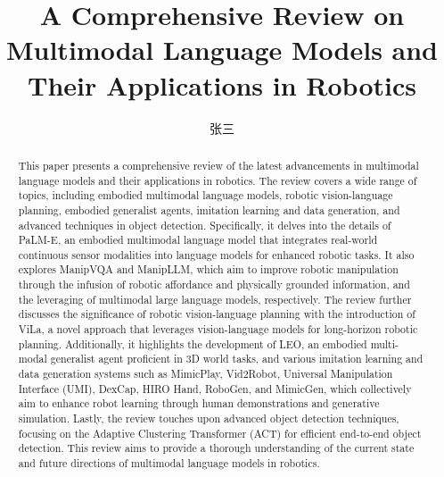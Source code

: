 \documentclass[a4paper]{article}
\title{A Comprehensive Review on Multimodal Language Models and Their Applications in Robotics}
\author{张三}
\begin{document}
\maketitle


 \begin{abstract} 
 This paper presents a comprehensive review of the latest advancements in multimodal language models and their applications in robotics. The review covers a wide range of topics, including embodied multimodal language models, robotic vision-language planning, embodied generalist agents, imitation learning and data generation, and advanced techniques in object detection. Specifically, it delves into the details of PaLM-E, an embodied multimodal language model that integrates real-world continuous sensor modalities into language models for enhanced robotic tasks. It also explores ManipVQA and ManipLLM, which aim to improve robotic manipulation through the infusion of robotic affordance and physically grounded information, and the leveraging of multimodal large language models, respectively. The review further discusses the significance of robotic vision-language planning with the introduction of ViLa, a novel approach that leverages vision-language models for long-horizon robotic planning. Additionally, it highlights the development of LEO, an embodied multi-modal generalist agent proficient in 3D world tasks, and various imitation learning and data generation systems such as MimicPlay, Vid2Robot, Universal Manipulation Interface (UMI), DexCap, HIRO Hand, RoboGen, and MimicGen, which collectively aim to enhance robot learning through human demonstrations and generative simulation. Lastly, the review touches upon advanced object detection techniques, focusing on the Adaptive Clustering Transformer (ACT) for efficient end-to-end object detection. This review aims to provide a thorough understanding of the current state and future directions of multimodal language models in robotics. 
 \end{abstract}
\end{document}
